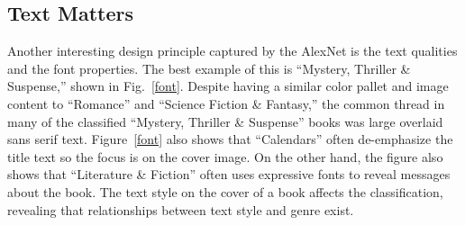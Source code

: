 \documentclass[conference]{IEEEtran}
\begin{document}
\subsection{Text Matters}
Another interesting design principle captured by the AlexNet is the text qualities and the font properties.
The best example of this is ``Mystery, Thriller \& Suspense,'' shown in Fig.~\ref{font}.
Despite having a similar color pallet and image content to ``Romance'' and ``Science Fiction \& Fantasy,'' the common thread in many of the classified ``Mystery, Thriller \& Suspense'' books was large overlaid sans serif text. 
Figure~\ref{font} also shows that ``Calendars'' often de-emphasize the title text so the focus is on the cover image.
On the other hand, the figure also shows that ``Literature \& Fiction'' often uses expressive fonts to reveal messages about the book.
The text style on the cover of a book affects the classification, revealing that relationships between text style and genre exist.
\end{document}
